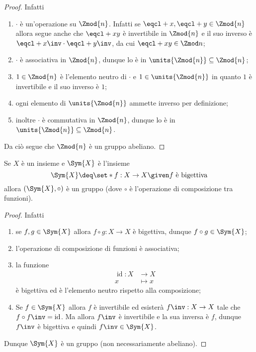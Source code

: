 \begin{proof}
    Infatti \begin{enumerate}[(G0)]
        \item $\cdot$ è un'operazione su $\Zmod{n}$. Infatti se $\eqcl+ x, \eqcl+ y \in \Zmod{n}$ allora segue anche che $\eqcl+{xy}$ è invertibile in $\Zmod{n}$ e il suo inverso è $\eqcl+{x\inv} \cdot \eqcl+{y\inv}$, da cui $\eqcl+{xy} \in \Zmod n$;
        \item $\cdot$ è associativa in $\Zmod{n}$, dunque lo è in $\units{\Zmod{n}} \subseteq \Zmod{n}$;
        \item $1 \in \Zmod{n}$ è l'elemento neutro di $\cdot$ e $1 \in \units{\Zmod{n}}$ in quanto $1$ è invertibile e il suo inverso è $1$;
        \item ogni elemento di $\units{\Zmod{n}}$ ammette inverso per definizione;
        \item inoltre $\cdot$ è commutativa in $\Zmod{n}$, dunque lo è in $\units{\Zmod{n}} \subseteq \Zmod{n}$.
    \end{enumerate}
    Da ciò segue che $\Zmod{n}$ è un gruppo abeliano.
\end{proof}
\begin{example}
    Se $X$ è un insieme e $\Sym{X}$ è l'insieme \[
        \Sym{X} \deq \set*{f : X \to X \given f \text{ è bigettiva}}    
    \] allora $(\Sym{X}, \circ)$ è un gruppo (dove $\circ$ è l'operazione di composizione tra funzioni).
\end{example}
\begin{proof}
    Infatti \begin{enumerate}[(G0)]
        \item se $f, g \in \Sym{X}$ allora $f \circ g : X \to X$ è bigettiva, dunque $f \circ g \in \Sym{X}$;
        \item l'operazione di composizione di funzioni è associativa;
        \item la funzione \begin{align*}
            \operatorname{id} : X &\to X\\
            x &\mapsto x
        \end{align*} è bigettiva ed è l'elemento neutro rispetto alla composizione;
        \item Se $f \in \Sym{X}$ allora $f$ è invertibile ed esisterà $f\inv : X \to X$ tale che $f \circ f\inv = \operatorname{id}$. Ma allora $f\inv$ è invertibile e la sua inversa è $f$, dunque $f\inv$ è bigettiva e quindi $f\inv \in \Sym{X}$.
    \end{enumerate}
    Dunque $\Sym{X}$ è un gruppo (non necessariamente abeliano).
\end{proof}

